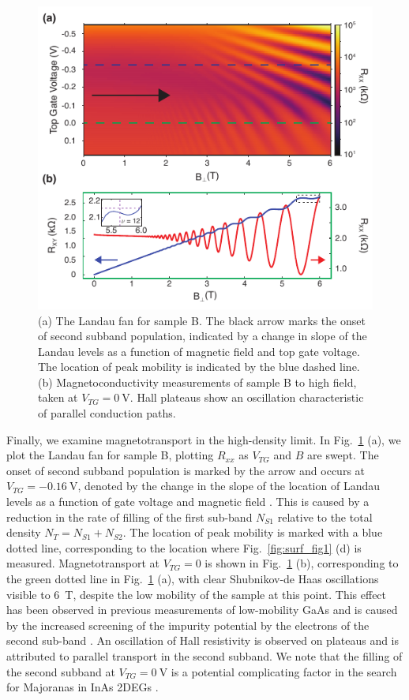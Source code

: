 \begin{figure}
    \includegraphics[width=0.6\linewidth]{Figure5}
    \caption[Second subband filling]{\label{fig:surf_fig5}(a) The Landau fan for sample B. The black arrow marks the onset of second subband population, indicated by a change in slope of the Landau levels as a function of magnetic field and top gate voltage. The location of peak mobility is indicated by the blue dashed line. (b) Magnetoconductivity measurements of sample B to high field, taken at $V_{TG} = \SI{0}{\volt}$. Hall plateaus show an oscillation characteristic of parallel conduction paths.}
\end{figure}

Finally, we examine magnetotransport in the high-density limit. In Fig.~\ref{fig:surf_fig5} (a), we plot the Landau fan for sample B, plotting $R_{xx}$ as $V_{TG}$ and $B$ are swept. The onset of second subband population is marked by the arrow and occurs at $V_{TG} = \SI{-0.16}{\volt}$, denoted by the change in the slope of the location of Landau levels as a function of gate voltage and magnetic field \cite{PhysRevB.74.195313,STORMER1982707}. This is caused by a reduction in the rate of filling of the first sub-band $N_{S1}$ relative to the total density $N_T = N_{S1} + N_{S2}$. The location of peak mobility is marked with a blue dotted line, corresponding to the location where Fig.~\ref{fig:surf_fig1} (d) is measured. Magnetotransport at $V_{TG} = 0$ is shown in Fig.~\ref{fig:surf_fig5} (b), corresponding to the green dotted line in Fig.~\ref{fig:surf_fig5} (a), with clear Shubnikov-de Haas oscillations visible to \SI{6}{\tesla}, despite the low mobility of the sample at this point. This effect has been observed in previous measurements of low-mobility GaAs and is caused by the increased screening of the impurity potential by the electrons of the second sub-band \cite{PhysRevB.38.7866}. An oscillation of Hall resistivity is observed on plateaus and is attributed to parallel transport in the second subband. We note that the filling of the second subband at $V_{TG} = \SI{0}{\volt}$ is a potential complicating factor in the search for Majoranas in InAs 2DEGs \cite{s41578-018-0003-1}.

